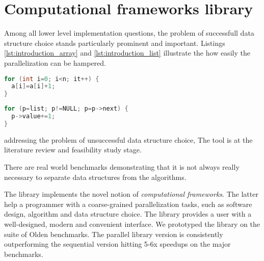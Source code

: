 \section{Computational frameworks library}
\label{introduction_frameworks}



\quad Among all lower level implementation questions, the problem of successfull data structure choice stands particularly prominent and important. Listings \ref{lst:introduction_array} and \ref{lst:introduction_list} illustrate the how easily the parallelization can be hampered.
\begin{minipage}[t]{0.4\linewidth}
\begin{lstlisting}[caption={Parallelisable loop operating on a \textbf{linear array}.},label={lst:introduction_array},language=C]
for (int i=0; i<n; it++) {
  a[i]=a[i]+1;
}
\end{lstlisting}
\end{minipage}
%
\begin{minipage}[t]{0.6\linewidth}
\begin{lstlisting}[caption={Non-parallelisable loop operating on a \textbf{linked-list}.},label={lst:introduction_list},language=C]
for (p=list; p!=NULL; p=p->next) {
  p->value+=1;
}
\end{lstlisting}
\end{minipage}



addressing the problem of unsuccessful data structure choice,
 The tool is at the literature review and feasibility study stage.
 

There are real world benchmarks demonstrating that it is not always really necessary to separate data structures from the algorithms.

The library implements the novel notion of \textit{computational frameworks}. The latter help a programmer with a coarse-grained parallelization tasks, such as software design, algorithm and data structure choice. The library provides a user with a well-designed, modern and convenient interface. We prototyped the library on the suite of Olden benchmarks. The parallel library version is consistently outperforming the sequential version hitting 5-6x speedups on the major benchmarks.\newline\null

